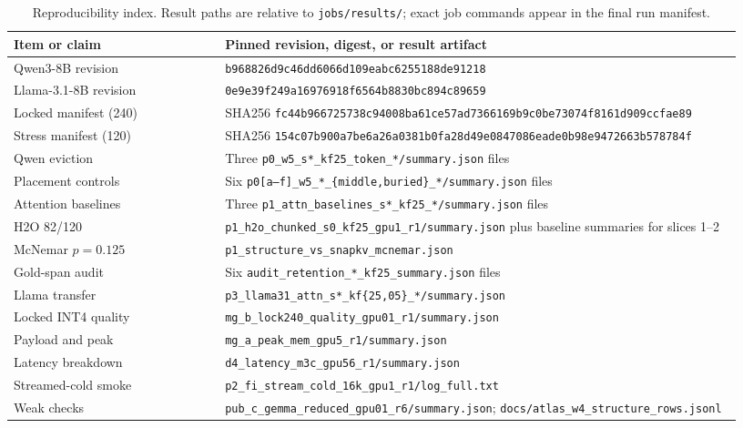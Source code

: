 \documentclass[10pt]{article}
\begin{document}
\begingroup
\footnotesize
\sloppy
{}
\begin{table}[!htbp]
  \centering
  \caption{Reproducibility index.  Result paths are relative to
  \texttt{jobs/results/}; exact job commands appear in the final run manifest.}
  \label{tab:artifacts}
  \begin{tabular}{@{}p{0.27\linewidth}p{0.66\linewidth}@{}}
    \toprule
    Item or claim & Pinned revision, digest, or result artifact \\
    \midrule
    Qwen3-8B revision & \texttt{b968826d9c46dd6066d109eabc6255188de91218} \\
    Llama-3.1-8B revision & \texttt{0e9e39f249a16976918f6564b8830bc894c89659} \\
    Locked manifest (240) & SHA256 \texttt{fc44b966725738c94008ba61ce57ad73}\allowbreak\texttt{66169b9c0be73074f8161d909ccfae89} \\
    Stress manifest (120) & SHA256 \texttt{154c07b900a7be6a26a0381b0fa28d49}\allowbreak\texttt{e0847086eade0b98e9472663b578784f} \\
    Qwen eviction & Three \texttt{p0\_w5\_s*\_kf25\_token\_*/summary.json} files \\
    Placement controls & Six \texttt{p0[a--f]\_w5\_*\_\{middle,buried\}\_*/summary.json} files \\
    Attention baselines & Three \texttt{p1\_attn\_baselines\_s*\_kf25\_*/summary.json} files \\
    H2O 82/120 & \texttt{p1\_h2o\_chunked\_s0\_kf25\_gpu1\_r1/summary.json} plus baseline summaries for slices 1--2 \\
    McNemar $p=0.125$ & \texttt{p1\_structure\_vs\_snapkv\_mcnemar.json} \\
    Gold-span audit & Six \texttt{audit\_retention\_*\_kf25\_summary.json} files \\
    Llama transfer & \texttt{p3\_llama31\_attn\_s*\_kf\{25,05\}\_*/summary.json} \\
    Locked INT4 quality & \texttt{mg\_b\_lock240\_quality\_gpu01\_r1/summary.json} \\
    Payload and peak & \texttt{mg\_a\_peak\_mem\_gpu5\_r1/summary.json} \\
    Latency breakdown & \texttt{d4\_latency\_m3c\_gpu56\_r1/summary.json} \\
    Streamed-cold smoke & \texttt{p2\_fi\_stream\_cold\_16k\_gpu1\_r1/log\_full.txt} \\
    Weak checks & \texttt{pub\_c\_gemma\_reduced\_gpu01\_r6/summary.json}; \texttt{docs/atlas\_w4\_structure\_rows.jsonl} \\
    \bottomrule
  \end{tabular}
\end{table}
\endgroup
\end{document}
